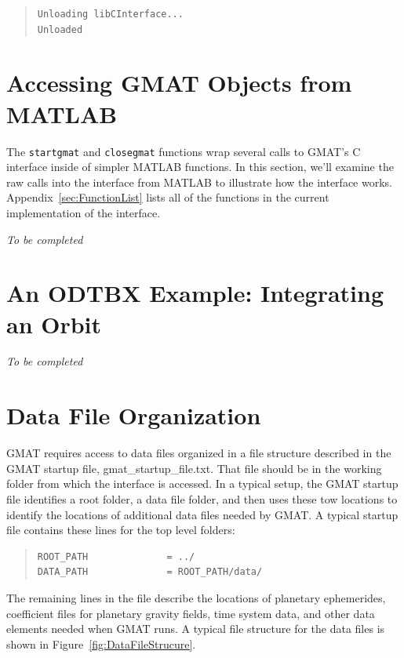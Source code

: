 \documentclass[letterpaper,10pt]{article}
\begin{document}
\begin{quote}
\begin{verbatim}
Unloading libCInterface...
Unloaded
\end{verbatim}
\end{quote}

\section{Accessing GMAT Objects from MATLAB}

The \texttt{startgmat} and \texttt{closegmat} functions wrap several calls to GMAT's C interface inside of simpler MATLAB functions.  In this section, we'll examine the raw calls into the interface from MATLAB to illustrate how the interface works.  Appendix~\ref{sec:FunctionList} lists all of the functions in the current implementation of the interface.

\textit{To be completed}

\section{An ODTBX Example: Integrating an Orbit}

\textit{To be completed}

\appendix

\section{\label{sec:DataFileOrganization}Data File Organization}

GMAT requires access to data files organized in a file structure described in the GMAT startup file, gmat\_startup\_file.txt.  That file should be in the working folder from which the interface is accessed.  In a typical setup, the GMAT startup file identifies a root folder, a data file folder, and then uses these tow locations to identify the locations of additional data files needed by GMAT.  A typical startup file contains these lines for the top level folders:

\begin{quote}
\begin{verbatim}
ROOT_PATH              = ../
DATA_PATH              = ROOT_PATH/data/
\end{verbatim}
\end{quote}

\noindent The remaining lines in the file describe the locations of planetary ephemerides, coefficient files for planetary gravity fields, time system data, and other data elements needed when GMAT runs.  A typical file structure for the data files is shown in Figure~\ref{fig:DataFileStrucure}.
\end{document}
